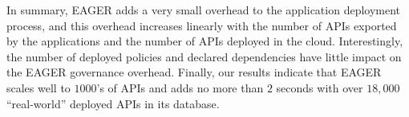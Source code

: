 In summary, EAGER adds a very small overhead to the application deployment
process, and 
this overhead increases linearly with the number of APIs exported by the applications
and the number of APIs deployed in the cloud. 
Interestingly, the number of deployed policies and declared dependencies
have little impact on the EAGER governance overhead. 
Finally, our results indicate that EAGER scales 
well to $1000$'s of APIs and adds no more than $2$ seconds with over
$18,000$ ``real-world'' deployed APIs in its database.
